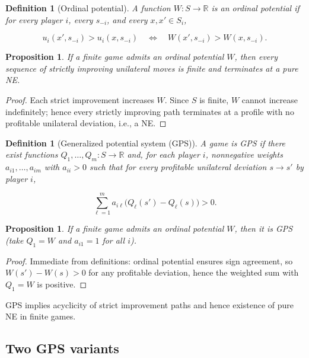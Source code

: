 \documentclass[11pt]{article}
\newtheorem{proposition}[theorem]{Proposition}
\newtheorem{definition}[theorem]{Definition}
\begin{document}
\begin{definition}[Ordinal potential]
A function \(W:S\to\mathbb R\) is an \emph{ordinal potential} if for every
player \(i\), every \(s_{-i}\), and every \(x,x'\in S_i\),


\[
u_i(x',s_{-i})>u_i(x,s_{-i}) \quad\Longleftrightarrow\quad W(x',s_{-i})>W(x,s_{-i}).
\]


\end{definition}

\begin{proposition}
If a finite game admits an ordinal potential \(W\), then every sequence of
strictly improving unilateral moves is finite and terminates at a pure NE.
\end{proposition}

\begin{proof}
Each strict improvement increases \(W\). Since \(S\) is finite, \(W\) cannot
increase indefinitely; hence every strictly improving path terminates at a
profile with no profitable unilateral deviation, i.e., a NE.
\end{proof}

\begin{definition}[Generalized potential system (GPS)]
A game is GPS if there exist functions \(Q_1,\dots,Q_m:S\to\mathbb R\) and,
for each player \(i\), nonnegative weights \(a_{i1},\dots,a_{im}\) with
\(a_{ii}>0\) such that for every profitable unilateral deviation \(s\to s'\)
by player \(i\),


\[
\sum_{\ell=1}^m a_{i\ell}\big(Q_\ell(s')-Q_\ell(s)\big)>0.
\]


\end{definition}

\begin{proposition}
If a finite game admits an ordinal potential \(W\), then it is GPS (take
\(Q_1=W\) and \(a_{i1}=1\) for all \(i\)).
\end{proposition}

\begin{proof}
Immediate from definitions: ordinal potential ensures sign agreement, so
\(W(s')-W(s)>0\) for any profitable deviation, hence the weighted sum with
\(Q_1=W\) is positive.
\end{proof}

GPS implies acyclicity of strict improvement paths and hence existence of
pure NE in finite games.



\subsection{Two GPS variants}
\end{document}
